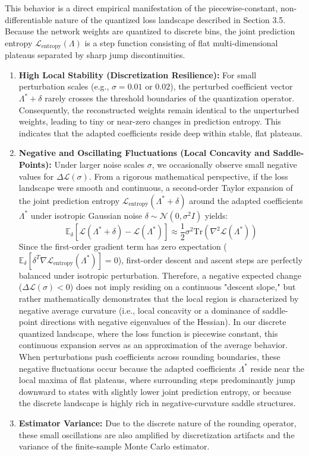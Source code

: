 This behavior is a direct empirical manifestation of the piecewise-constant, non-differentiable nature of the quantized loss landscape described in Section 3.5. Because the network weights are quantized to discrete bins, the joint prediction entropy $\mathcal{L}_{\text{entropy}}(\Lambda)$ is a step function consisting of flat multi-dimensional plateaus separated by sharp jump discontinuities.
\begin{enumerate}
    \item \textbf{High Local Stability (Discretization Resilience):} For small perturbation scales (e.g., $\sigma = 0.01$ or $0.02$), the perturbed coefficient vector $\Lambda^* + \delta$ rarely crosses the threshold boundaries of the quantization operator. Consequently, the reconstructed weights remain identical to the unperturbed weights, leading to tiny or near-zero changes in prediction entropy. This indicates that the adapted coefficients reside deep within stable, flat plateaus.
    \item \textbf{Negative and Oscillating Fluctuations (Local Concavity and Saddle-Points):} Under larger noise scales $\sigma$, we occasionally observe small negative values for $\Delta \mathcal{L}(\sigma)$. From a rigorous mathematical perspective, if the loss landscape were smooth and continuous, a second-order Taylor expansion of the joint prediction entropy $\mathcal{L}_{\text{entropy}}(\Lambda^* + \delta)$ around the adapted coefficients $\Lambda^*$ under isotropic Gaussian noise $\delta \sim \mathcal{N}(0, \sigma^2 I)$ yields:
    \begin{equation}
    \label{eq:taylor_perturb}
    \mathbb{E}_{\delta}\left[ \mathcal{L}(\Lambda^* + \delta) - \mathcal{L}(\Lambda^*) \right] \approx \frac{1}{2} \sigma^2 \text{Tr}\left(\nabla^2 \mathcal{L}(\Lambda^*)\right)
    \end{equation}
    Since the first-order gradient term has zero expectation ($\mathbb{E}_{\delta}[\delta^T \nabla \mathcal{L}_{\text{entropy}}(\Lambda^*)] = 0$), first-order descent and ascent steps are perfectly balanced under isotropic perturbation. Therefore, a negative expected change ($\Delta \mathcal{L}(\sigma) < 0$) does not imply residing on a continuous "descent slope," but rather mathematically demonstrates that the local region is characterized by negative average curvature (i.e., local concavity or a dominance of saddle-point directions with negative eigenvalues of the Hessian).
    In our discrete quantized landscape, where the loss function is piecewise constant, this continuous expansion serves as an approximation of the average behavior. When perturbations push coefficients across rounding boundaries, these negative fluctuations occur because the adapted coefficients $\Lambda^*$ reside near the local maxima of flat plateaus, where surrounding steps predominantly jump downward to states with slightly lower joint prediction entropy, or because the discrete landscape is highly rich in negative-curvature saddle structures.
    \item \textbf{Estimator Variance:} Due to the discrete nature of the rounding operator, these small oscillations are also amplified by discretization artifacts and the variance of the finite-sample Monte Carlo estimator.
\end{enumerate}
